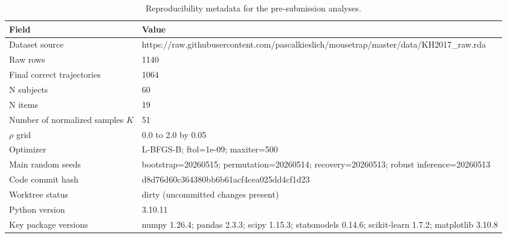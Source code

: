 \begin{table}[htbp]
\centering
\small
\caption{Reproducibility metadata for the pre-submission analyses.}
\label{tab:reproducibility-metadata}
\begin{tabular}{ll}
\toprule
Field & Value \\
\midrule
Dataset source & https://raw.githubusercontent.com/pascalkieslich/mousetrap/master/data/KH2017\_raw.rda \\
Raw rows & 1140 \\
Final correct trajectories & 1064 \\
N subjects & 60 \\
N items & 19 \\
Number of normalized samples $K$ & 51 \\
$\rho$ grid & 0.0 to 2.0 by 0.05 \\
Optimizer & L-BFGS-B; ftol=1e-09; maxiter=500 \\
Main random seeds & bootstrap=20260515; permutation=20260514; recovery=20260513; robust inference=20260513 \\
Code commit hash & d8d76d60c364380bb6b61acf4cea025dd4cf1d23 \\
Worktree status & dirty (uncommitted changes present) \\
Python version & 3.10.11 \\
Key package versions & numpy 1.26.4; pandas 2.3.3; scipy 1.15.3; statsmodels 0.14.6; scikit-learn 1.7.2; matplotlib 3.10.8 \\
\bottomrule
\end{tabular}
\end{table}
